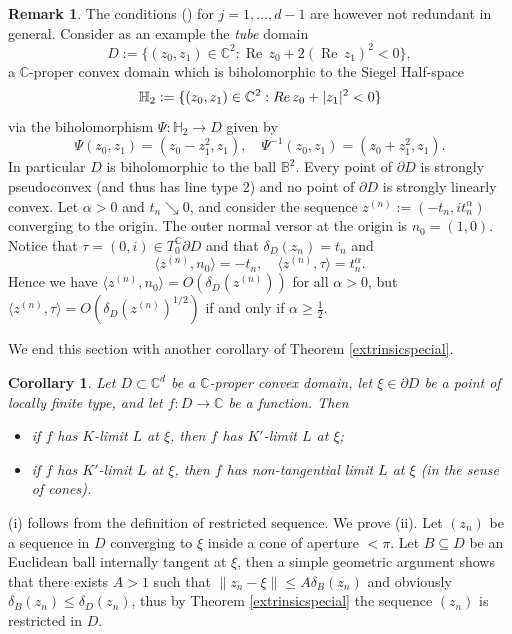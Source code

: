 \documentclass[11pt, reqno]{amsart}
\numberwithin{equation}{section}
\newtheorem{corollary}[theorem]{Corollary}
\theoremstyle{definition}
\newtheorem{remark}[theorem]{Remark}
\newcommand{\C}{\mathbb{C}}
\newcommand{\B}{\mathbb{B}}
\renewcommand{\H}{\mathbb{H}}
\renewcommand{\Re}{{\operatorname{Re}\,}}
\begin{document}
{{			
			\begin{remark}
		The  conditions () for $j=1,\dots,d-1$ are however not redundant in general.
Consider as an  example the  {\sl tube} domain
			$$D:=\{(z_0,z_1)\in\C^2: \Re z_0+2(\Re z_1)^2<0\},$$
a $\C$-proper convex domain which is  biholomorphic to the Siegel Half-space 
			 $$\H_2:=\{(z_0,z_1)\in \C^2: {\rm Re}\,z_0+|z_1|^2<0\}$$ 
			via the biholomorphism $\Psi\colon \H_2\to D$ given by
				$$\Psi(z_0,z_1)=\left(z_0-z_1^2,z_1\right),\quad \Psi^{-1}(z_0,z_1)=\left(z_0+z_1^2,z_1\right).$$ In particular $D$ is biholomorphic to the ball $\B^2$.
			Every point of $\partial D$ is strongly pseudoconvex (and thus has line type 2)
			and no point of $\partial D$ is strongly linearly convex.  
			 Let $\alpha>0$ and $t_n\searrow0$, and consider the sequence $z^{(n)}:=(-t_n,it_n^\alpha)$ converging to the origin. The outer normal versor at the origin is $n_0=(1,0)$. Notice that   $\tau=(0,i)\in T_0^\C\partial D$ and  that $\delta_D(z_n)= t_n$ and
			$$\langle z^{(n)},n_0\rangle=-t_n,\quad \langle z^{(n)},\tau\rangle=t_n^{\alpha}.$$
			Hence we have $\langle z^{(n)},n_0\rangle=O(\delta_D(z^{(n)}))$ for all $\alpha>0$, but  $\langle z^{(n)},\tau\rangle=O(\delta_D(z^{(n)})^{1/2})$ if and only if $\alpha\geq\frac{1}{2}$.
				\end{remark}
							
We end this section with another corollary of Theorem \ref{extrinsicspecial}.
		\begin{corollary}\label{rk->nt}
			Let $D\subset\C^d$ be a $\C$-proper convex domain, let $\xi\in\partial D$ be a point of locally finite type, and let $f\colon D\to\C$ be a function. Then
			\begin{itemize}
				\item[(i)] if $f$ has $K$-limit $L$ at $\xi$, then  $f$ has  $K'$-limit $L$ at $\xi$;
				\item[(ii)] if $f$ has  $K'$-limit $L$ at $\xi$, then  $f$ has non-tangential limit $L$ at $\xi$ (in the sense of cones).
			\end{itemize}
		\end{corollary}
		\proof
		(i) follows from the definition of restricted sequence. We prove (ii).
		Let $(z_n)$ be a sequence in $D$ converging to $\xi$ inside a cone of aperture $<\pi$.
		Let $B\subseteq D$ be an Euclidean ball internally tangent at $\xi$, then a simple geometric argument shows that there exists $A>1$ such that $\|z_n-\xi\|\leq A\delta_B(z_n)$ and obviously $\delta_B(z_n)\leq\delta_D(z_n)$,
		thus by Theorem \ref{extrinsicspecial} the sequence $(z_n)$ is restricted in $D$.
		\endproof
}}
\end{document}
